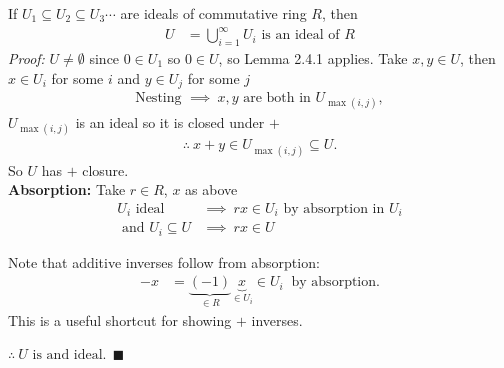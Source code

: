 \begin{lemma*}
    If $U_1 \subseteq U_2 \subseteq U_3 \cdots$ are ideals of commutative ring $R$, then 
    \begin{align*}
        U &= \bigcup_{i=1}^\infty U_i \text{   is an ideal of }R
    \end{align*}
    \textit{Proof:} $U\neq \emptyset$ since $0\in U_1$ so $0\in U$, so Lemma 2.4.1 applies. Take $x,y\in U$, then $x\in U_i$ for some $i$ and $y\in U_j$ for some $j$
    \begin{align*}
        \text{Nesting } \implies \ x,y \text{ are both in } U_{\max(i,j)},
    \end{align*}
    $U_{\max(i,j)}$ is an ideal so it is closed under $+$
    \begin{align*}        
        \therefore \ x+y \in U_{\max(i,j)} \subseteq U.
    \end{align*}
    So $U$ has $+$ closure. \\
    \textbf{Absorption:} Take $r\in R$, $x$ as above
    \begin{align*}
        U_i \text{ ideal }& \implies \ rx \in U_i \text{ by absorption in }U_i \\
        \text{ and }U_i \subseteq U &\implies \ rx \in U 
    \end{align*}
    \begin{tcolorbox}
        Note that additive inverses follow from absorption:
        \begin{align*}
            -x &= \underbrace{(-1)}_{\in R}\underbrace{x}_{\in U_i} \in U_i \ \text{ by absorption}. 
        \end{align*}
        This is a useful shortcut for showing $+$ inverses.
    \end{tcolorbox}
    $\therefore \ U \text{ is and ideal}. \ \ \blacksquare$
\end{lemma*}


